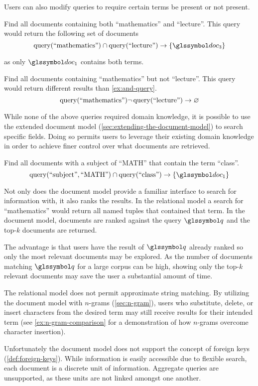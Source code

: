 		Users can also modify queries to require certain terms be present or not present.
		
		\begin{ex}
		\label{ex:and-query}
			Find all documents containing both ``mathematics'' and ``lecture''.  This query would return the following set of documents
			\[
				\query(\text{``mathematics''}) \cap \query(\text{``lecture''}) \rightarrow \{\doc_3\}
			\]
			
			as only \(\doc_1\) contains both terms.
		\end{ex}
		
		\begin{ex}
			Find all documents containing ``mathematics'' but not ``lecture''.  This query would return different results than \vref{ex:and-query}.
			\[
				\operatorname{query}(\text{``mathematics''})\neg\operatorname{query}(\text{``lecture''}) \rightarrow \varnothing
			\]
		\end{ex}
		
		While none of the above queries required domain knowledge, it is possible to use the extended document model (\vref{sec:extending-the-document-model}) to search specific fields.  Doing so permits users to leverage their existing domain knowledge in order to achieve finer control over what documents are retrieved.
		
		\begin{ex}
			Find all documents with a subject of ``MATH'' that contain the term ``class''.
			\[
				\query(\text{``subject''}, \text{``MATH''}) \cap \query(\text{``class''}) \rightarrow \{\doc_1\}
			\]
		\end{ex}
		
		Not only does the document model provide a familiar interface to search for information with, it also ranks the results.  In the relational model a search for ``mathematics'' would return all named tuples that contained that term.  In the document model, documents are ranked against the query \(\q\) and the top-\(k\) documents are returned.
		
		The advantage is that users have the result of \(\q\) already ranked so only the most relevant documents may be explored.	 As the number of documents matching \(\q\) for a large corpus can be high, showing only the top-\(k\) relevant documents may save the user a substantial amount of time.
		
		The relational model does not permit approximate string matching.  By utilizing the document model with \(n\)-grams (\vref{sec:n-gram}), users who substitute, delete, or insert characters from the desired term may still receive results for their intended term (see \vref{ex:n-gram-comparison} for a demonstration of how \(n\)-grams overcome character insertion).
		
		Unfortunately the document model does not support the concept of foreign keys (\vref{def:foreign-keys}).  While information is easily accessible due to flexible search, each document is a discrete unit of information.  Aggregate queries are unsupported, as these units are not linked amongst one another.